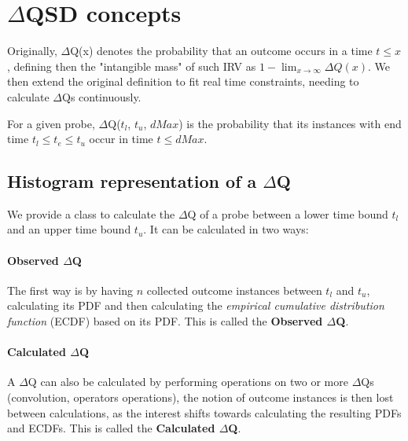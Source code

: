 \section{$\Delta$QSD concepts}

Originally, $\Delta$Q(x) denotes the probability that an outcome occurs in a time $t \le x$, defining then the "intangible mass" of such IRV as $1 - \lim_{x\to\infty} \Delta Q (x)$.
We then extend the original definition to fit real time constraints, needing to calculate $\Delta$Qs continuously.

For a given probe, $\Delta$Q($t_l$, $t_u$, $dMax$) is the probability that its instances with end time $t_l \le t_e \le t_u$ occur in time $t \le dMax$.

\subsection{Histogram representation of a $\Delta$Q}
    We provide a class to calculate the $\Delta$Q of a probe between a lower time bound $t_l$ and an upper time bound $t_u$. It can be calculated in two ways: 
    
    \paragraph{Observed $\Delta$Q}
    
    The first way is by having $n$ collected outcome instances between $t_l$ and $t_u$, calculating its PDF and then calculating the \textit{empirical cumulative distribution function} (ECDF) based on its PDF. This is called the \textbf{Observed $\Delta$Q}.
    
    \paragraph{Calculated $\Delta$Q}
    
    A $\Delta$Q can also be calculated by performing operations on two or more $\Delta$Qs (convolution, operators operations), the notion of outcome instances is then lost between calculations, as the interest shifts towards calculating the resulting PDFs and ECDFs. This is called the \textbf{Calculated $\Delta$Q}.
    
